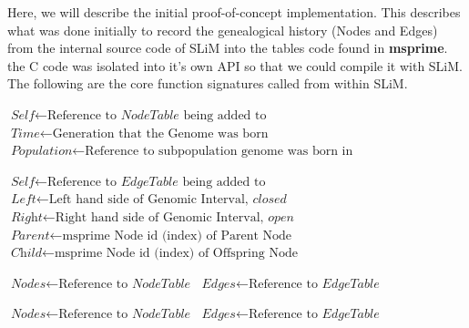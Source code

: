 \documentclass{article}
\begin{document}
Here, we will describe the initial proof-of-concept implementation. 
This describes what was done initially to
record the genealogical history (Nodes and Edges) from the internal
source code of SLiM
into the tables code found in \textbf{msprime}.
the C code was isolated into it's own API so that we could compile it with SLiM.
The following are the core function signatures called from within SLiM. 
\vspace{25mm} %
\begin{algorithmic}[1]

\State $\textit{Self} \gets \text{Reference to }\textit{NodeTable}\text{ being added to}$
\State $\textit{Time} \gets \text{Generation that the Genome was born}$
\State $\textit{Population} \gets \text{Reference to subpopulation genome was born in}$
\EndProcedure

\State $\textit{Self} \gets \text{Reference to }\textit{EdgeTable}\text{ being added to}$
\State $\textit{Left} \gets \text{Left hand side of Genomic Interval, }\textit{closed} $
\State $\textit{Right} \gets \text{Right hand side of Genomic Interval, }\textit{open} $
\State $\textit{Parent} \gets \text{msprime Node id (index) of Parent Node}$
\State $\textit{Child} \gets \text{msprime Node id (index) of Offspring Node}$
\EndProcedure

\State $\textit{Nodes} \gets \text{Reference to }\textit{NodeTable}$
\State $\textit{Edges} \gets \text{Reference to }\textit{EdgeTable}$
\EndProcedure

\State $\textit{Nodes} \gets \text{Reference to }\textit{NodeTable}$
\State $\textit{Edges} \gets \text{Reference to }\textit{EdgeTable}$
\EndProcedure

\end{algorithmic}
\vspace{5mm} %
\end{document}
